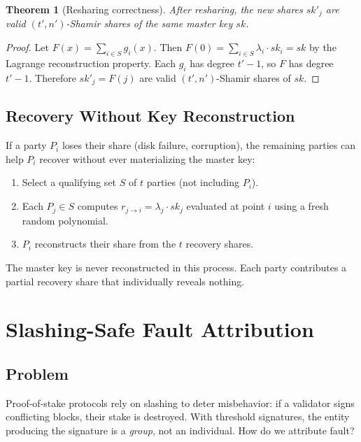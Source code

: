 \documentclass[11pt,a4paper]{article}
\newtheorem{theorem}{Theorem}[section]
\begin{document}
\begin{theorem}[Resharing correctness]
After resharing, the new shares $sk'_j$ are valid $(t', n')$-Shamir shares of the
same master key $sk$.
\end{theorem}

\begin{proof}
Let $F(x) = \sum_{i \in S} g_i(x)$. Then $F(0) = \sum_{i \in S} \lambda_i \cdot sk_i = sk$
by the Lagrange reconstruction property. Each $g_i$ has degree $t' - 1$, so $F$ has
degree $t' - 1$. Therefore $sk'_j = F(j)$ are valid $(t', n')$-Shamir shares of $sk$.
\end{proof}

\subsection{Recovery Without Key Reconstruction}

If a party $P_i$ loses their share (disk failure, corruption), the remaining parties
can help $P_i$ recover without ever materializing the master key:

\begin{enumerate}[leftmargin=2em]
  \item Select a qualifying set $S$ of $t$ parties (not including $P_i$).
  \item Each $P_j \in S$ computes $r_{j \to i} = \lambda_j \cdot sk_j$ evaluated at
        point $i$ using a fresh random polynomial.
  \item $P_i$ reconstructs their share from the $t$ recovery shares.
\end{enumerate}

The master key is never reconstructed in this process. Each party contributes a
partial recovery share that individually reveals nothing.

\section{Slashing-Safe Fault Attribution}
\label{sec:slashing}

\subsection{Problem}

Proof-of-stake protocols rely on slashing to deter misbehavior: if a validator signs
conflicting blocks, their stake is destroyed. With threshold signatures, the entity
producing the signature is a \emph{group}, not an individual. How do we attribute
fault?
\end{document}
